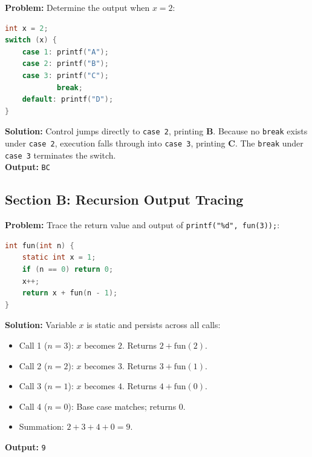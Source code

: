 \begin{tcolorbox}[colback=white,colframe=primary,title=\textbf{Question 5: Switch Statement Fall-Through}]
\textbf{Problem:} Determine the output when $x = 2$:
\begin{lstlisting}[language=C]
int x = 2;
switch (x) {
    case 1: printf("A");
    case 2: printf("B");
    case 3: printf("C");
            break;
    default: printf("D");
}
\end{lstlisting}
\textbf{Solution:} Control jumps directly to \texttt{case 2}, printing \textbf{B}. Because no \texttt{break} exists under \texttt{case 2}, execution falls through into \texttt{case 3}, printing \textbf{C}. The \texttt{break} under \texttt{case 3} terminates the switch. \\
\textbf{Output:} \texttt{BC}
\end{tcolorbox}

\subsection{Section B: Recursion Output Tracing}

\begin{tcolorbox}[colback=white,colframe=primary,title=\textbf{Question 6: Static Variable Accumulation in Recursion}]
\textbf{Problem:} Trace the return value and output of \texttt{printf("\%d", fun(3));}:
\begin{lstlisting}[language=C]
int fun(int n) {
    static int x = 1;
    if (n == 0) return 0;
    x++;
    return x + fun(n - 1);
}
\end{lstlisting}
\textbf{Solution:}
Variable $x$ is static and persists across all calls:
\begin{itemize}[leftmargin=*]
    \item Call 1 ($n=3$): $x$ becomes $2$. Returns $2 + \text{fun}(2)$.
    \item Call 2 ($n=2$): $x$ becomes $3$. Returns $3 + \text{fun}(1)$.
    \item Call 3 ($n=1$): $x$ becomes $4$. Returns $4 + \text{fun}(0)$.
    \item Call 4 ($n=0$): Base case matches; returns $0$.
    \item Summation: $2 + 3 + 4 + 0 = 9$.
\end{itemize}
\textbf{Output:} \texttt{9}
\end{tcolorbox}

